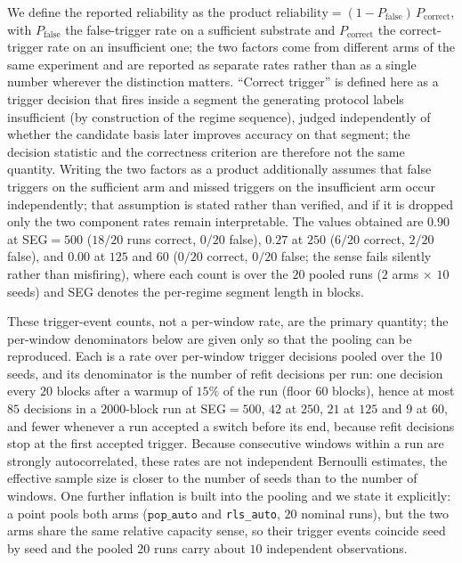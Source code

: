 \documentclass[preprint,12pt]{elsarticle}
\begin{document}
We define the reported reliability as
the product
$\text{reliability}=(1-P_{\mathrm{false}})\,P_{\mathrm{correct}}$, with
$P_{\mathrm{false}}$ the false-trigger rate on a sufficient substrate and
$P_{\mathrm{correct}}$ the correct-trigger rate on an insufficient one; the
two factors come from different arms of the same experiment and are reported
as separate rates rather than as a single number wherever the distinction
matters. ``Correct trigger'' is defined here as a trigger decision that
fires inside a segment the generating protocol labels insufficient (by
construction of the regime sequence), judged independently of whether the
candidate basis later improves accuracy on that segment; the decision
statistic and the correctness criterion are therefore not the same quantity.
Writing the two factors as a product additionally assumes that false
triggers on the sufficient arm and missed triggers on the insufficient arm
occur independently; that assumption is stated rather than verified, and if
it is dropped only the two component rates remain interpretable. The values
obtained are $0.90$ at SEG$=500$ ($18/20$ runs correct, $0/20$ false),
$0.27$ at $250$ ($6/20$ correct, $2/20$ false), and $0.00$ at $125$ and $60$
($0/20$ correct, $0/20$ false; the sense fails silently rather than
misfiring), where each count is over the $20$ pooled runs ($2$ arms $\times$
$10$ seeds) and SEG denotes the per-regime segment length in blocks.

These
trigger-event counts, not a per-window rate, are the primary quantity; the
per-window denominators below are given only so that the pooling can be
reproduced. Each is a rate over
per-window trigger decisions pooled over the 10 seeds, and its denominator is
the number of refit decisions per run: one decision every $20$ blocks
after a warmup of $15\%$ of the run (floor $60$ blocks), hence at most $85$
decisions in a $2000$-block run at SEG$=500$, $42$ at $250$, $21$ at $125$
and $9$ at $60$, and fewer whenever a run accepted a switch before its end,
because refit decisions stop at the first accepted trigger. Because
consecutive
windows within a run are strongly autocorrelated, these rates are not
independent Bernoulli estimates, the effective sample size is closer to
the number of seeds than to the number of windows. One further inflation is
built into the pooling and we state it explicitly: a point pools both arms
($\texttt{pop\_auto}$ and \texttt{rls\_auto}, $20$ nominal runs), but the two
arms share the same relative capacity sense, so their trigger events coincide
seed by seed and the pooled $20$ runs carry about $10$ independent
observations.
\end{document}

